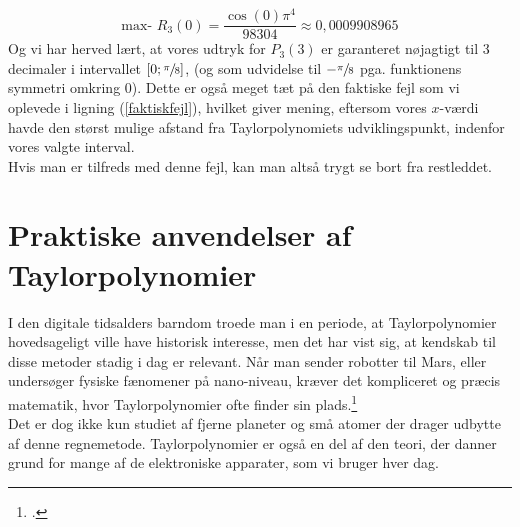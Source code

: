\documentclass[12pt, a4paper]{article}
\begin{document}
\begin{refsection}
    \begin{equation*}
       \text{max- } R_{3}(0)=\frac{\cos(0)\pi^4}{98304}\approx 0{,}0009908965
    \end{equation*}
    Og vi har herved lært, at vores udtryk for $P_3(3)$ er garanteret nøjagtigt til 3 decimaler i intervallet $[0;\sfrac{\pi}{8}]$, (og som udvidelse til $-\sfrac{\pi}{8}$ pga. funktionens symmetri omkring 0). Dette er også meget tæt på den faktiske fejl som vi oplevede i ligning (\ref{faktiskfejl}), hvilket giver mening, eftersom vores $x$-værdi havde den størst mulige afstand fra Taylorpolynomiets udviklingspunkt, indenfor vores valgte interval.\\
Hvis man er tilfreds med denne fejl, kan man altså trygt se bort fra restleddet. 
\section{Praktiske anvendelser af Taylorpolynomier}
I den digitale tidsalders barndom troede man i en periode, at Taylorpolynomier hovedsageligt ville have historisk interesse, men det har vist sig, at kendskab til disse metoder stadig i dag er relevant. Når man sender robotter til Mars, eller undersøger fysiske fænomener på nano-niveau, kræver det kompliceret og præcis matematik, hvor Taylorpolynomier ofte finder sin plads.\footcite[s. 11]{hvadermatematik}\\
Det er dog ikke kun studiet af fjerne planeter og små atomer der drager udbytte af denne regnemetode. Taylorpolynomier er også en del af den teori, der danner grund for mange af de elektroniske apparater, som vi bruger hver dag. 

\end{refsection}
\end{document}
